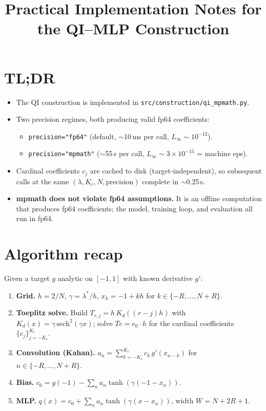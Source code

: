 \documentclass[11pt]{article}
\title{Practical Implementation Notes for the QI--MLP Construction}
\author{}
\date{}
\begin{document}
\maketitle

\section{TL;DR}

\begin{itemize}
\item The QI construction is implemented in \texttt{src/construction/qi\_mpmath.py}.
\item Two precision regimes, both producing valid fp64 coefficients:
  \begin{itemize}
  \item \texttt{precision="fp64"} (default, $\sim$10\,ms per call, $L_\infty \sim 10^{-12}$).
  \item \texttt{precision="mpmath"} ($\sim$55\,s per call, $L_\infty \sim 3\times 10^{-15}$ = machine eps).
  \end{itemize}
\item Cardinal coefficients $c_j$ are cached to disk (target-independent), so subsequent
      calls at the same $(\lambda, K_c, N, \text{precision})$ complete in $\sim$0.25\,s.
\item \textbf{mpmath does not violate fp64 assumptions.} It is an offline computation that
      produces fp64 coefficients; the model, training loop, and evaluation all run in fp64.
\end{itemize}

\section{Algorithm recap}

Given a target $g$ analytic on $[-1,1]$ with known derivative $g'$:

\begin{enumerate}
\item \textbf{Grid.} $h = 2/N$, $\gamma = \lambda^*/h$, $x_k = -1 + kh$ for $k \in \{-R, \ldots, N+R\}$.
\item \textbf{Toeplitz solve.} Build $T_{r,j} = h\,K_d((r-j)h)$ with $K_d(x) = \gamma\,\mathrm{sech}^2(\gamma x)$; solve $Tc = e_0 \cdot h$ for the cardinal coefficients $\{c_j\}_{j=-K_c}^{K_c}$.
\item \textbf{Convolution (Kahan).} $a_n = \sum_{k=-K_c}^{K_c} c_k\, g'(x_{n-k})$ for $n \in \{-R,\ldots,N+R\}$.
\item \textbf{Bias.} $c_0 = g(-1) - \sum_n a_n \tanh(\gamma(-1 - x_n))$.
\item \textbf{MLP.} $q(x) = c_0 + \sum_n a_n \tanh(\gamma(x - x_n))$, width $W = N + 2R + 1$.
\end{enumerate}
\end{document}
